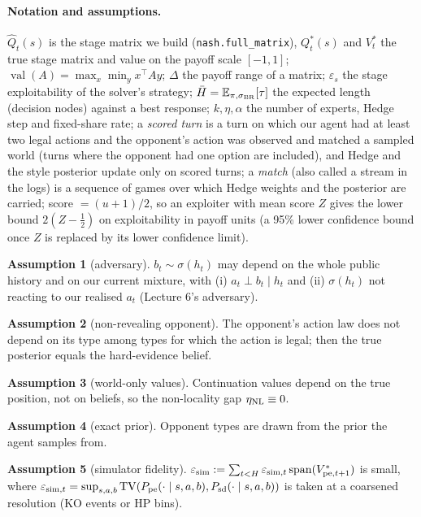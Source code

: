 \documentclass[10pt]{article}
\theoremstyle{plain}
\theoremstyle{definition}
\newtheorem{assumption}{Assumption}
\theoremstyle{remark}
\newcommand{\E}{\mathbb{E}}
\DeclareMathOperator{\val}{val}
\DeclareMathOperator{\TV}{TV}
\DeclareMathOperator{\spanop}{span}
\newcommand{\epss}{\varepsilon_s}
\newcommand{\epssim}{\varepsilon_{\mathrm{sim}}}
\newcommand{\Hbar}{\bar H}
\newcommand{\Qhat}{\hat Q}
\begin{document}
\paragraph{Notation and assumptions.} $\Qhat_t(s)$ is the stage matrix we build (\texttt{nash.full\_matrix}),
$Q^*_t(s)$ and $V^*_t$ the true stage matrix and value on the payoff scale $[-1,1]$; $\val(A)=\max_x\min_yx^\top Ay$;
$\Delta$ the payoff range of a matrix; $\epss$ the stage exploitability of the solver's strategy; $\Hbar=\E_{\pi,\sigma_{\rm BR}}[\tau]$ the expected
length (decision nodes) against a best response; $k,\eta,\alpha$ the number of experts, Hedge step and fixed-share
rate; a \emph{scored turn} is a turn on which our agent had at least two legal actions and the opponent's action was observed and matched a sampled world (turns where the opponent had one option are included), and Hedge and the style posterior update only on scored turns; a \emph{match} (also called a stream in the logs) is a sequence of games over which Hedge weights and the posterior are carried; score $=(u+1)/2$, so an exploiter with mean score $Z$ gives the lower bound $2(Z-\tfrac12)$ on exploitability in payoff units (a 95\% lower confidence bound once $Z$ is replaced by its lower confidence limit).
\begin{assumption}[adversary]\label{asm:A1}
$b_t\sim\sigma(h_t)$ may depend on the whole public history and on our current mixture, with (i) $a_t\perp b_t\mid h_t$
and (ii) $\sigma(h_t)$ not reacting to our realised $a_t$ (Lecture 6's adversary).
\end{assumption}
\begin{assumption}[non-revealing opponent]\label{asm:A2} The opponent's action law does not depend on its type among
types for which the action is legal; then the true posterior equals the hard-evidence belief.\end{assumption}
\begin{assumption}[world-only values]\label{asm:A3} Continuation values depend on the true position, not on beliefs, so
the non-locality gap $\eta_{\rm NL}\equiv0$.\end{assumption}
\begin{assumption}[exact prior]\label{asm:A4} Opponent types are drawn from the prior the agent samples from.\end{assumption}
\begin{assumption}[simulator fidelity]\label{asm:A5}
$\epssim:=\sum_{t<H}\varepsilon_{{\rm sim},t}\spanop(V^*_{{\rm pe},t+1})$ is small, where
$\varepsilon_{{\rm sim},t}=\sup_{s,a,b}\TV(P_{\rm pe}(\cdot\mid s,a,b),P_{\rm sd}(\cdot\mid s,a,b))$ is taken at a
coarsened resolution (KO events or HP bins).
\end{assumption}
\end{document}
